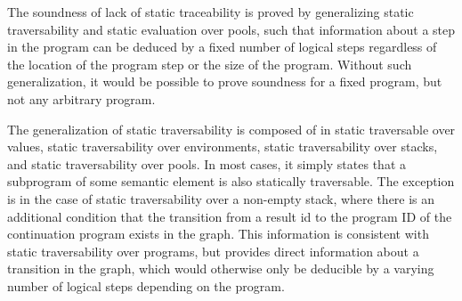 \documentclass[10pt]{article}
\begin{document}
The soundness of lack of static traceability is proved by generalizing
static traversability and static evaluation over pools, such that information about a step in
the program can be deduced by a fixed number of logical steps regardless of the location of the
program step or the size of the program. Without such generalization, it would be possible to
prove soundness for a fixed program, but not any arbitrary program.

The generalization of static traversability is composed of in static traversable over values,
static traversability over environments, static traversability over stacks, and static
traversability over pools.
In most cases, it simply states that a subprogram of some semantic element is also statically
traversable. The exception is in the case of
static traversability over a non-empty stack, where
there is an additional condition that the transition
from a result id to the program ID
of the continuation program exists in the graph.
This information is consistent with static
traversability over programs, but provides direct information about a transition in the
graph, which would otherwise only be deducible by a varying number of logical steps
depending on the program.
\end{document}
